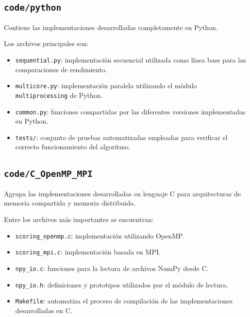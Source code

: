 \subsection{\texttt{code/python}}

Contiene las implementaciones desarrolladas completamente en Python.

Los archivos principales son:

\begin{itemize}

\item \texttt{sequential.py}: implementación secuencial utilizada como línea base para las comparaciones de rendimiento.

\item \texttt{multicore.py}: implementación paralela utilizando el módulo \texttt{multiprocessing} de Python.

\item \texttt{common.py}: funciones compartidas por las diferentes versiones implementadas en Python.

\item \texttt{tests/}: conjunto de pruebas automatizadas empleadas para verificar el correcto funcionamiento del algoritmo.

\end{itemize}

\subsection{\texttt{code/C\_OpenMP\_MPI}}

Agrupa las implementaciones desarrolladas en lenguaje C para arquitecturas de memoria compartida y memoria distribuida.

Entre los archivos más importantes se encuentran:

\begin{itemize}

\item \texttt{scoring\_openmp.c}: implementación utilizando OpenMP.

\item \texttt{scoring\_mpi.c}: implementación basada en MPI.

\item \texttt{npy\_io.c}: funciones para la lectura de archivos NumPy desde C.

\item \texttt{npy\_io.h}: definiciones y prototipos utilizados por el módulo de lectura.

\item \texttt{Makefile}: automatiza el proceso de compilación de las implementaciones desarrolladas en C.

\end{itemize}

